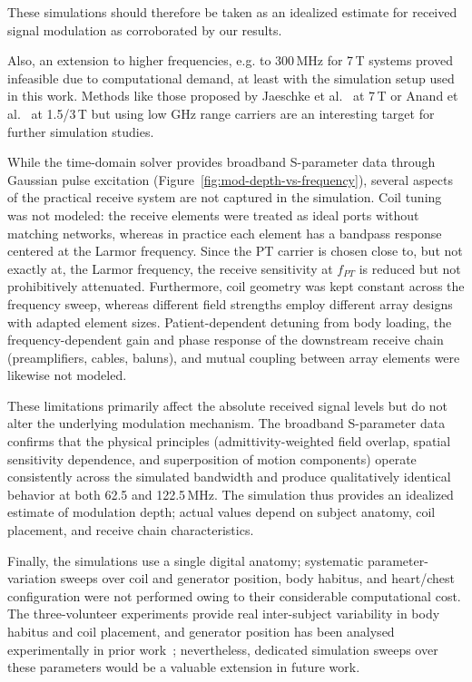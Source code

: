 \documentclass[
]{article}
\begin{document}
These simulations should therefore be taken as an idealized estimate for
received signal modulation as corroborated by our results.

Also, an extension to higher frequencies, e.g. to 300\,MHz for 7\,T systems
proved infeasible due to computational demand, at least with the
simulation setup used in this work. Methods like those proposed by
Jaeschke et al.\ \cite{Jaeschke2017, Jaeschke2017a, Jaeschke2019ScatteringMonitoring} at 7\,T or Anand et al.\ \cite{Anand2021BeatNavigators, Anand2024BeatFrequencies} at 1.5/3\,T but
using low GHz range carriers are an interesting target for further
simulation studies.

While the time-domain solver provides broadband S-parameter data through Gaussian pulse excitation (Figure~\ref{fig:mod-depth-vs-frequency}), several aspects of the practical receive system are not captured in the simulation. Coil tuning was not modeled: the receive elements were treated as ideal ports without matching networks, whereas in practice each element has a bandpass response centered at the Larmor frequency. 
Since the PT carrier is chosen close to, but not exactly at, the Larmor frequency, the receive sensitivity at $f_{PT}$ is reduced but not prohibitively attenuated. Furthermore, coil geometry was kept constant across the frequency sweep, whereas different field strengths employ different array designs with adapted element sizes. Patient-dependent detuning from body loading, the frequency-dependent gain and phase response of the downstream receive chain (preamplifiers, cables, baluns), and mutual coupling between array elements were likewise not modeled.

These limitations primarily affect the absolute received signal levels but do not alter the underlying modulation mechanism. The broadband S-parameter data confirms that the physical principles (admittivity-weighted field overlap, spatial sensitivity dependence, and superposition of motion components) operate consistently across the simulated bandwidth and produce qualitatively identical behavior at both 62.5 and 122.5\,MHz. The simulation thus provides an idealized estimate of modulation depth; actual values depend on subject anatomy, coil placement, and receive chain characteristics.

Finally, the simulations use a single digital anatomy; systematic parameter-variation sweeps over coil and generator position, body habitus, and heart/chest configuration were not performed owing to their considerable computational cost. The three-volunteer experiments provide real inter-subject variability in body habitus and coil placement, and generator position has been analysed experimentally in prior work~\cite{Bacher2017PilotInitialization}; nevertheless, dedicated simulation sweeps over these parameters would be a valuable extension in future work.
\end{document}
